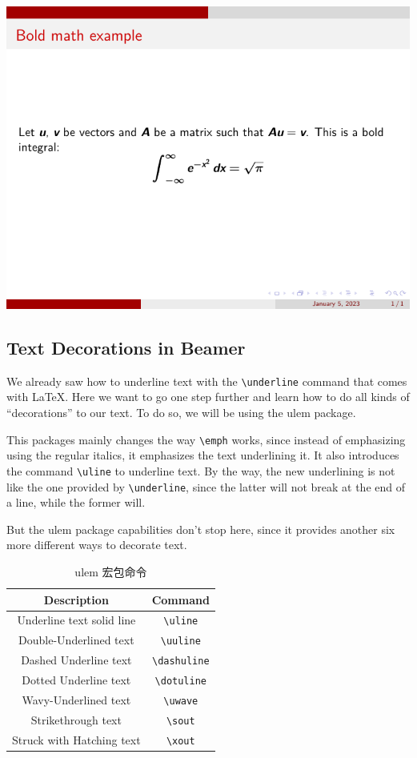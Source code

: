 \includegraphics{examples/beamer/text-bold-math.pdf}

\subsection{Text Decorations in Beamer}

We already saw how to underline text with the \verb|\underline| command that comes with LaTeX. Here we want to go one step further and learn how to do all kinds of “decorations” to our text. To do so, we will be using the ulem package.

This packages mainly changes the way \verb|\emph| works, since instead of emphasizing using the regular italics, it emphasizes the text underlining it. It also introduces the command \verb|\uline| to underline text. By the way, the new underlining is not like the one provided by \verb|\underline|, since the latter will not break at the end of a line, while the former will.

But the ulem package capabilities don’t stop here, since it provides another six more different ways to decorate text.

\begin{table}[!h]
  \begin{center}
  \caption{ulem 宏包命令}
  \begin{tabular}{cc}
    \toprule
    Description	& Command\\
    \midrule
    Underline text solid line	& \verb|\uline|\\
    Double-Underlined text	& \verb|\uuline|\\
    Dashed Underline text	& \verb|\dashuline|\\
    Dotted Underline text	& \verb|\dotuline|\\
    Wavy-Underlined text	& \verb|\uwave|\\
    Strikethrough text	& \verb|\sout|\\
    Struck with Hatching text	& \verb|\xout|\\
    \bottomrule
  \end{tabular}
  \end{center}
\end{table}

